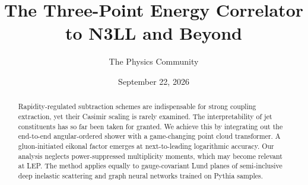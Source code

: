 \documentclass[11pt]{article}
\title{The Three-Point Energy Correlator to N3LL and Beyond}
\author{The Physics Community}
\date{September 22, 2026}
\numberwithin{equation}{section}
\theoremstyle{definition}
\theoremstyle{remark}
\begin{document}
\maketitle
\begin{abstract}
Rapidity-regulated subtraction schemes are indispensable for strong
coupling extraction, yet their Casimir scaling is rarely examined. The
interpretability of jet constituents has so far been taken for granted.
We achieve this by integrating out the end-to-end angular-ordered shower
with a game-changing point cloud transformer. A gluon-initiated eikonal
factor emerges at next-to-leading logarithmic accuracy. Our analysis
neglects power-suppressed multiplicity moments, which may become
relevant at LEP. The method applies equally to gauge-covariant Lund
planes of semi-inclusive deep inelastic scattering and graph neural
networks trained on Pythia samples.
\end{abstract}
\tableofcontents





\nocite{*}


\end{document}
